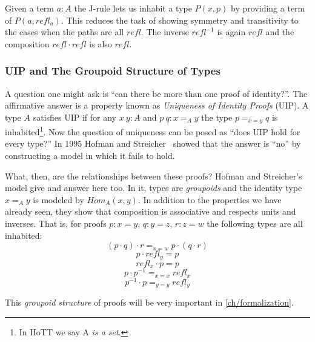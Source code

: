 Given a term $a:A$ the J-rule lets us inhabit a type $P(x,p)$ by providing a
term of $P(a, refl_a)$. This reduces the task of showing symmetry and
transitivity to the cases when the paths are all $refl$. The inverse $refl^{-1}$
is again $refl$ and the composition $refl \cdot refl$ is also $refl$.


\subsubsection{UIP and The Groupoid Structure of Types}

A question one might ask is ``can there be more than one proof of identity?''.
The affirmative answer is a property known as \emph{Uniqueness of Identity Proofs} (UIP). A
type $A$ satisfies UIP if for any $x~y : A$ and $p~q : x =_A y$ the type $p =_{x
= y} q$ is inhabited\footnote{In HoTT we say A \emph{is a set}.}. Now the
question of uniqueness can be posed as ``does UIP hold for every type?'' In 1995
Hofman and Streicher~\cite{Hofman1998} showed that the answer is ``no'' by
constructing a model in which it fails to hold.

What, then, are the relationships between these proofs? Hofman and Streicher's
model give and answer here too. In it, types are \emph{groupoids} and the
identity type $x =_A y$ is modeled by $Hom_A(x, y)$. In addition to the
properties we have already seen, they show that composition is associative and
respects units and inverses. That is, for proofs $p : x = y$, $q : y = z$, $r :
z = w$ the following types are all inhabited:
\[(p \cdot q) \cdot r =_{x = w} p \cdot (q \cdot r)\]
\[p \cdot refl_y = p\]
\[refl_x \cdot p = p\]
\[p \cdot p^{-1} =_{x = x} refl_x\]
\[p^{-1} \cdot p =_{y = y} refl_y\]

This \emph{groupoid structure} of proofs will be very important in \autoref{ch/formalization}.
